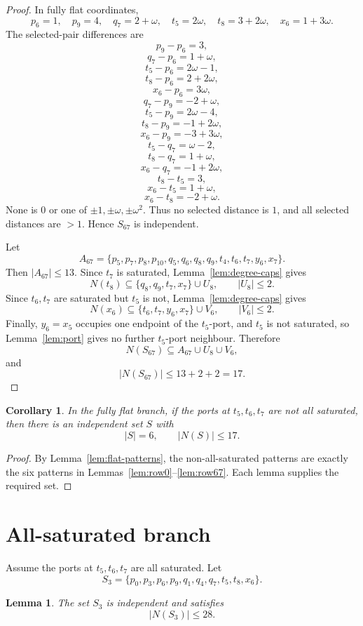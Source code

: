 \documentclass[11pt]{article}
\theoremstyle{plain}
\newtheorem{lemma}{Lemma}
\newtheorem{corollary}{Corollary}
\numberwithin{equation}{section}
\begin{document}
\begin{proof}
In fully flat coordinates,
\[
 p_6=1,
 \quad p_9=4,
 \quad q_7=2+\omega,
 \quad t_5=2\omega,
 \quad t_8=3+2\omega,
 \quad x_6=1+3\omega.
\]
The selected-pair differences are
\[
 p_9-p_6=3,
\]
\[
 q_7-p_6=1+\omega,
\]
\[
 t_5-p_6=2\omega-1,
\]
\[
 t_8-p_6=2+2\omega,
\]
\[
 x_6-p_6=3\omega,
\]
\[
 q_7-p_9=-2+\omega,
\]
\[
 t_5-p_9=2\omega-4,
\]
\[
 t_8-p_9=-1+2\omega,
\]
\[
 x_6-p_9=-3+3\omega,
\]
\[
 t_5-q_7=\omega-2,
\]
\[
 t_8-q_7=1+\omega,
\]
\[
 x_6-q_7=-1+2\omega,
\]
\[
 t_8-t_5=3,
\]
\[
 x_6-t_5=1+\omega,
\]
\[
 x_6-t_8=-2+\omega.
\]
None is $0$ or one of $\pm1,\pm\omega,\pm\omega^2$. Thus no selected distance is $1$, and all selected distances are $>1$. Hence $S_{67}$ is independent.

Let
\[
 A_{67}=\{p_5,p_7,p_8,p_{10},q_5,q_6,q_8,q_9,t_4,t_6,t_7,y_6,x_7\}.
\]
Then $|A_{67}|\le13$. Since $t_7$ is saturated, Lemma~\ref{lem:degree-caps} gives
\[
 N(t_8)\subseteq\{q_8,q_9,t_7,x_7\}\cup U_8,
 \qquad |U_8|\le2.
\]
Since $t_6,t_7$ are saturated but $t_5$ is not, Lemma~\ref{lem:degree-caps} gives
\[
 N(x_6)\subseteq\{t_6,t_7,y_6,x_7\}\cup V_6,
 \qquad |V_6|\le2.
\]
Finally, $y_6=x_5$ occupies one endpoint of the $t_5$-port, and $t_5$ is not saturated, so Lemma~\ref{lem:port} gives no further $t_5$-port neighbour. Therefore
\[
 N(S_{67})\subseteq A_{67}\cup U_8\cup V_6,
\]
and
\[
 |N(S_{67})|\le13+2+2=17.
\]
\end{proof}

\begin{corollary}\label{cor:flat-nonall}
In the fully flat branch, if the ports at $t_5,t_6,t_7$ are not all saturated, then there is an independent set $S$ with
\[
 |S|=6,
 \qquad
 |N(S)|\le17.
\]
\end{corollary}

\begin{proof}
By Lemma~\ref{lem:flat-patterns}, the non-all-saturated patterns are exactly the six patterns in Lemmas~\ref{lem:row0}--\ref{lem:row67}. Each lemma supplies the required set.
\end{proof}

\clearpage
\section{All-saturated branch}

Assume the ports at $t_5,t_6,t_7$ are all saturated. Let
\[
 S_3=\{p_0,p_3,p_6,p_9,q_1,q_4,q_7,t_5,t_8,x_6\}.
\]

\begin{lemma}\label{lem:S3}
The set $S_3$ is independent and satisfies
\[
 |N(S_3)|\le28.
\]
\end{lemma}
\end{document}
